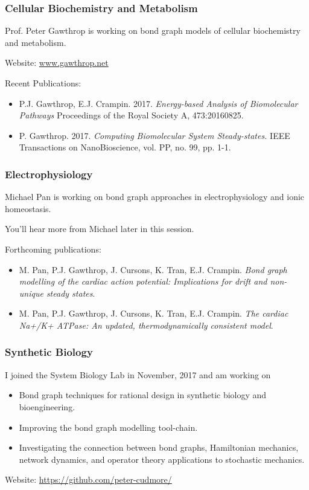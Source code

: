 \documentclass[11pt,reqno]{beamer}
\begin{document}
\begin{frame}
\frametitle{Cellular Biochemistry and Metabolism}

Prof. Peter Gawthrop is working on bond graph models of cellular biochemistry and metabolism.\\
\vspace{10pt}

Website: \url{www.gawthrop.net}
\vspace{10pt}

Recent Publications:
\begin{itemize}
	\itemsep1em
	\item  P.J. Gawthrop, E.J. Crampin. 2017. \emph{Energy-based Analysis of Biomolecular Pathways}
	Proceedings of the Royal Society A, 473:20160825.
	\item P. Gawthrop. 2017. \emph{Computing Biomolecular System Steady-states.}
	 IEEE Transactions on NanoBioscience, vol. PP, no. 99, pp. 1-1. 
\end{itemize}


\end{frame}
\begin{frame}
\frametitle{Electrophysiology}
Michael Pan is working on bond graph approaches in electrophysiology and ionic homeostasis. \\
\vspace{10pt}

You'll hear more from Michael later in this session.\\
\vspace{10pt}

Forthcoming publications:
\begin{itemize}
	\itemsep1em
	\item M. Pan, P.J. Gawthrop, J. Cursons, K. Tran, E.J. Crampin. \emph{Bond graph modelling of the cardiac action potential: Implications for drift and non-unique steady states}.
	\item M. Pan, P.J. Gawthrop, J. Cursons, K. Tran, E.J. Crampin.
	\emph{The cardiac Na+/K+ ATPase: An updated, thermodynamically consistent model}.
\end{itemize}
\end{frame}
\begin{frame}
\frametitle{Synthetic Biology}
I joined the System Biology Lab in November, 2017 and am working on
\begin{itemize}
	\itemsep1em
	\item Bond graph techniques for rational design in synthetic biology and bioengineering.
	\item Improving the bond graph modelling tool-chain. 
	\item Investigating the connection between bond graphs, Hamiltonian mechanics, network dynamics, and operator theory applications to stochastic mechanics.
\end{itemize}
\vspace{10pt}


Website: \url{https://github.com/peter-cudmore/}

\end{frame}
\end{document}
